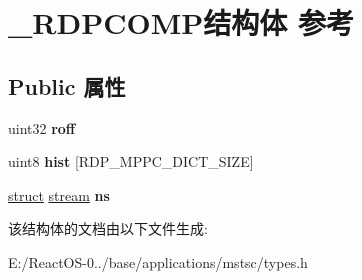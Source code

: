\hypertarget{struct___r_d_p_c_o_m_p}{}\section{\+\_\+\+R\+D\+P\+C\+O\+M\+P结构体 参考}
\label{struct___r_d_p_c_o_m_p}
\subsection*{Public 属性}
\begin{DoxyCompactItemize}
\item 
\mbox{\label{struct___r_d_p_c_o_m_p_ab9bdf8e981973d52a0928346ecdac875}} 
uint32 {\bfseries roff}
\item 
\mbox{\label{struct___r_d_p_c_o_m_p_aea8e0e39a933d85de08d367f8defec5b}} 
uint8 {\bfseries hist} \mbox{[}R\+D\+P\+\_\+\+M\+P\+P\+C\+\_\+\+D\+I\+C\+T\+\_\+\+S\+I\+ZE\mbox{]}
\item 
\mbox{\label{struct___r_d_p_c_o_m_p_a119826f23d2ff905e431876539d7f0df}} 
\hyperlink{interfacestruct}{struct} \hyperlink{structstream}{stream} {\bfseries ns}
\end{DoxyCompactItemize}


该结构体的文档由以下文件生成\+:\begin{DoxyCompactItemize}
\item 
E\+:/\+React\+O\+S-\/0../base/applications/mstsc/types.\+h\end{DoxyCompactItemize}
